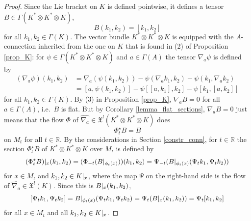 \documentclass{amsart}
\theoremstyle{plain}
\newcommand{\R}{\mathbb{R}}
\newcommand{\mx}{\mathfrak{X}}
\newcommand{\an}[1]{\arrowvert_{#1}}
\begin{document}
\begin{proof}
Since the Lie bracket on $K$ is defined pointwise, it defines a tensor $B\in\Gamma(K^*\otimes K^*\otimes K)$,
\[ B(k_1,k_2)=[k_1,k_2]
\]
for all $k_1, k_2\in\Gamma(K)$. The vector bundle $K^*\otimes K^*\otimes K$ is equipped with the $A$-connection inherited from the one on $K$ that is found in (2) of Proposition \ref{prop_K}:
for $\psi\in \Gamma(K^*\otimes K^*\otimes K)$ and $a\in\Gamma(A)$ the tensor $\nabla_a\psi$ is defined by 
\begin{equation*}
\begin{split}
(\nabla_a\psi)(k_1,k_2)&=\nabla_a(\psi(k_1,k_2))-\psi(\nabla_ak_1,k_2)-\psi(k_1,\nabla_ak_2)\\
&=[a, \psi(k_1,k_2)]-\psi[[a,k_1], k_2]-\psi[k_1,[a, k_2]]
\end{split}
\end{equation*}
for all $k_1, k_2\in\Gamma(K)$.
By (3) in Proposition \ref{prop_K}, $\nabla_aB=0$ for all $a\in\Gamma(A)$, i.e.~$B$ is flat. But by Corollary \ref{lemma_flat_sections}, $\nabla_aB=0$ just means that  the flow $\Phi$ of $\widehat{\nabla_a}\in\mx^l(K^*\otimes K^*\otimes K)$ does 
\[ \Phi_t^\star B=B
\]
on $M_t$ for all $t\in \R$. 
By the considerations in Section \ref{constr_conn}, for $t\in\R$ the section $\Phi_t^\star B$ of $K^*\otimes K^*\otimes K$ over $M_t$ is defined by
\[ (\Phi_t^\star B)\an{x}(k_1,k_2)=(\Phi_{-t}(B\an{\phi_t(x)}))(k_1,k_2)=\Psi_{-t}(B\an{\phi_t(x)}(\Psi_tk_1,\Psi_tk_2))
\]
for $x\in M_t$ and $k_1,k_2\in K\an{x}$, where the map $\Psi$ on the right-hand side is the flow of $\widehat{\nabla_a}\in\mx^l(K)$. Since this is $B\an{x}(k_1,k_2)$, 
\[ [\Psi_t k_1,\Psi_tk_2]=B\an{\phi_t(x)}(\Psi_t k_1, \Psi_tk_2)=\Psi_t(B\an{x}(k_1,k_2))=\Psi_t[k_1,k_2]
\] 
for all $x\in M_t$ and all $k_1,k_2\in K\an{x}$.

\bigskip



\end{proof}
\end{document}
